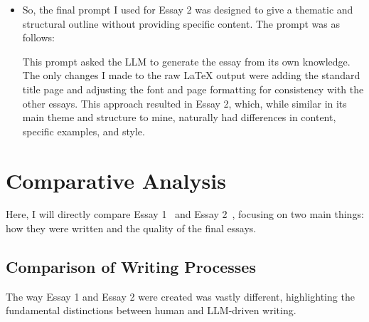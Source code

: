 \documentclass[11pt,a4paper]{article}
\begin{document}
\begin{itemize}
    \item So, the final prompt I used for Essay 2 was designed to give a thematic and structural outline without providing specific content. The prompt was as follows:
    \vspace{-0.5em}
    \begin{center}
    \setlength{\fboxsep}{5pt}
    \setlength{\fboxrule}{1pt}
    \end{center}
    This prompt asked the LLM to generate the essay from its own knowledge. The only changes I made to the raw LaTeX output were adding the standard title page and adjusting the font and page formatting for consistency with the other essays. This approach resulted in Essay 2, which, while similar in its main theme and structure to mine, naturally had differences in content, specific examples, and style.
\end{itemize}

\section{Comparative Analysis}

Here, I will directly compare Essay 1~\cite{essay1} and Essay 2~\cite{essay2}, focusing on two main things: how they were written and the quality of the final essays.

\subsection{Comparison of Writing Processes}

The way Essay 1 and Essay 2 were created was vastly different, highlighting the fundamental distinctions between human and LLM-driven writing.
\end{document}
